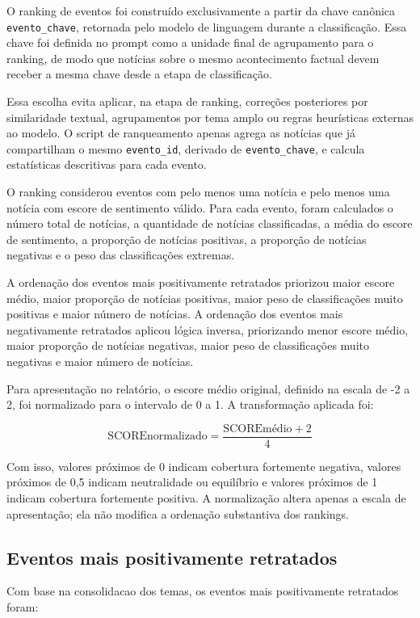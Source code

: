 \documentclass[12pt,a4paper]{article}
\begin{document}
O ranking de eventos foi construído exclusivamente a partir da chave canônica \texttt{evento\_chave}, retornada pelo modelo de linguagem durante a classificação. Essa chave foi definida no prompt como a unidade final de agrupamento para o ranking, de modo que notícias sobre o mesmo acontecimento factual devem receber a mesma chave desde a etapa de classificação.

Essa escolha evita aplicar, na etapa de ranking, correções posteriores por similaridade textual, agrupamentos por tema amplo ou regras heurísticas externas ao modelo. O script de ranqueamento apenas agrega as notícias que já compartilham o mesmo \texttt{evento\_id}, derivado de \texttt{evento\_chave}, e calcula estatísticas descritivas para cada evento.

O ranking considerou eventos com pelo menos uma notícia e pelo menos uma notícia com escore de sentimento válido. Para cada evento, foram calculados o número total de notícias, a quantidade de notícias classificadas, a média do escore de sentimento, a proporção de notícias positivas, a proporção de notícias negativas e o peso das classificações extremas.

A ordenação dos eventos mais positivamente retratados priorizou maior escore médio, maior proporção de notícias positivas, maior peso de classificações muito positivas e maior número de notícias. A ordenação dos eventos mais negativamente retratados aplicou lógica inversa, priorizando menor escore médio, maior proporção de notícias negativas, maior peso de classificações muito negativas e maior número de notícias.

Para apresentação no relatório, o escore médio original, definido na escala de -2 a 2, foi normalizado para o intervalo de 0 a 1. A transformação aplicada foi:

\[
\text{SCOREnormalizado} = \frac{\text{SCOREmédio} + 2}{4}
\]

Com isso, valores próximos de 0 indicam cobertura fortemente negativa, valores próximos de 0,5 indicam neutralidade ou equilíbrio e valores próximos de 1 indicam cobertura fortemente positiva. A normalização altera apenas a escala de apresentação; ela não modifica a ordenação substantiva dos rankings.


\subsection{Eventos mais positivamente retratados}

Com base na consolidacao dos temas, os eventos mais positivamente retratados foram:
\end{document}
